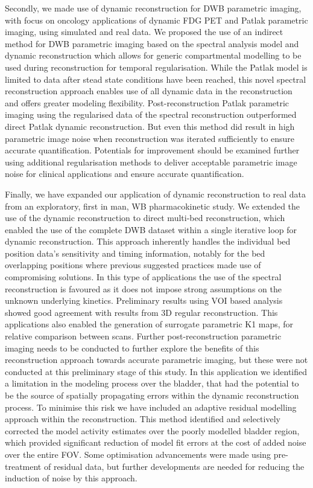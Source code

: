 Secondly, we made use of dynamic reconstruction for DWB parametric imaging, with focus on oncology applications of dynamic FDG PET and Patlak parametric imaging, using simulated and real data.
We proposed the use of an indirect method for DWB parametric imaging based on the spectral analysis model and dynamic reconstruction which allows for generic compartmental modelling to be used during reconstruction for temporal regularisation. While the Patlak model is limited to data after stead state conditions have been reached, this novel spectral reconstruction approach enables use of all dynamic data in the reconstruction and offers greater modeling flexibility. Post-reconstruction Patlak parametric imaging using the regularised data of the spectral reconstruction outperformed direct Patlak dynamic reconstruction. But even this method did result in high parametric image noise when reconstruction was iterated sufficiently to ensure accurate quantification. Potentials for improvement should be examined further using additional regularisation methods to deliver acceptable parametric image noise for clinical applications and ensure accurate quantification.

Finally, we have expanded our application of dynamic reconstruction to real data from an exploratory, first in man, WB pharmacokinetic study. We extended the use of the dynamic reconstruction to direct multi-bed reconstruction, which enabled the use of the complete DWB dataset within a single iterative loop for dynamic reconstruction. This approach inherently handles the individual bed position data's sensitivity and timing information, notably for the bed overlapping positions where previous suggested practices made use of compromising solutions. In this type of applications the use of the spectral reconstruction is favoured as it does not impose strong assumptions on the unknown underlying kinetics. Preliminary results using VOI based analysis showed good agreement with results from 3D regular reconstruction. This applications also enabled the generation of surrogate parametric K1 maps, for relative comparison between scans.
Further post-reconstruction parametric imaging needs to be conducted to further explore the benefits of this reconstruction approach towards accurate parametric imaging, but these were not conducted at this preliminary stage of this study.
In this application we identified a limitation in the modeling process over the bladder, that had the potential to be the source of spatially propagating errors within the dynamic reconstruction process. 
To minimise this risk we have included an adaptive residual modelling approach within the reconstruction. This method identified and selectively corrected the model activity estimates over the poorly modelled bladder region, which provided significant reduction of model fit errors at the cost of added noise over the entire FOV. Some optimisation advancements were made using pre-treatment of residual data, but further developments are needed for reducing the induction of noise by this approach. 

